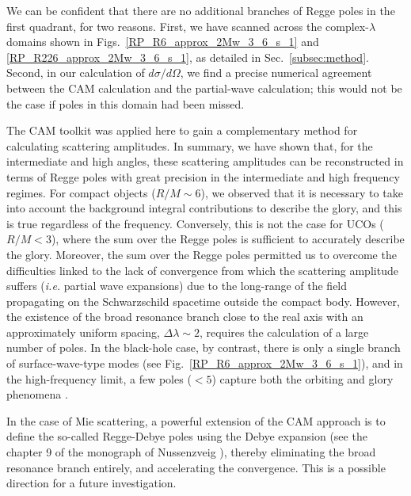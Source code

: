 \documentclass[aps,prd,longbibliography,reprint,twocolumn,amsmath,amssymb,amsfonts,showpacs,footnote,superscriptaddress]{revtex4-1}%
\begin{document}
We can be confident that there are no additional branches of Regge poles in the first quadrant, for two reasons. First, we have scanned across the complex-$\lambda$ domains shown in Figs.~\ref{RP_R6_approx_2Mw_3_6_s_1} and \ref{RP_R226_approx_2Mw_3_6_s_1}, as detailed in Sec.~\ref{subsec:method}. Second, in our calculation of $d\sigma/d\Omega$, we find a precise numerical agreement between the CAM calculation and the partial-wave calculation; this would not be the case if poles in this domain had been missed.

The CAM toolkit was applied here to gain a complementary method for calculating scattering amplitudes. In summary, we have shown that, for the intermediate and high angles, these scattering amplitudes can be reconstructed in terms of Regge poles with great precision in the intermediate and high frequency regimes. For compact objects ($R/M\sim6$), we observed that it is necessary to take into account the background integral contributions to describe the glory, and this is true regardless of the frequency. Conversely, this is not the case for UCOs ($R/M < 3$), where the sum over the Regge poles is sufficient to accurately describe the glory. Moreover, the sum over the Regge poles permitted us to overcome the difficulties linked to the lack of convergence from which the scattering amplitude suffers (\textit{i.e.} partial wave expansions) due to the long-range of the field propagating on the Schwarzschild spacetime outside the compact body. However, the existence of the broad resonance branch %
close to the real axis with an approximately uniform spacing, $\Delta\lambda\sim 2$, requires the calculation of a large number of poles. In the black-hole case, by contrast, there is only a single branch of surface-wave-type modes (see Fig.~\ref{RP_R6_approx_2Mw_3_6_s_1}), and in the high-frequency limit, a few poles ($<5$) capture both the orbiting and glory phenomena \cite{Folacci:2019cmc, Folacci:2019vtt}. 

In the case of Mie scattering, a powerful extension of the CAM approach is to define the so-called Regge-Debye poles using the Debye expansion (see the chapter 9 of the monograph of Nussenzveig \cite{Nussenzveig:2006}), thereby eliminating the broad resonance branch entirely, and accelerating the convergence. This is a possible direction for a future investigation.

\end{document}
